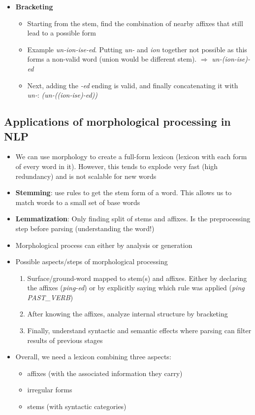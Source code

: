 \begin{itemize}
	\item \textbf{Bracketing}
	\begin{itemize}
		\item Starting from the stem, find the combination of nearby affixes that still lead to a possible form
		\item Example \textit{un-ion-ise-ed}. Putting \textit{un-} and \textit{ion} together not possible as this forms a non-valid word (union would be different stem). $\Rightarrow$ \textit{un-(ion-ise)-ed}
		\item Next, adding the \textit{-ed} ending is valid, and finally concatenating it with \textit{un-}: \textit{(un-((ion-ise)-ed))}
	\end{itemize}
\end{itemize}
\subsection{Applications of morphological processing in NLP}
\begin{itemize}
	\item We can use morphology to create a full-form lexicon (lexicon with each form of every word in it). However, this tends to explode very fast (high redundancy) and is not scalable for new words
	\item \textbf{Stemming}: use rules to get the stem form of a word. This allows us to match words to a small set of base words
	\item \textbf{Lemmatization}: Only finding split of stems and affixes. Is the preprocessing step before parsing (understanding the word!)
	\item Morphological process can either by analysis or generation
	\item Possible aspects/steps of morphological processing
	\begin{enumerate}
		\item Surface/ground-word mapped to stem(s) and affixes. Either by declaring the affixes (\textit{ping-ed}) or by explicitly saying which rule was applied (\textit{ping} \textit{PAST\_VERB})
		\item After knowing the affixes, analyze internal structure by bracketing
		\item Finally, understand syntactic and semantic effects where parsing can filter results of previous stages
	\end{enumerate}
	\item Overall, we need a lexicon combining three aspects:
	\begin{itemize}
		\item affixes (with the associated information they carry)
		\item irregular forms
		\item stems (with syntactic categories)
	\end{itemize}
\end{itemize}
